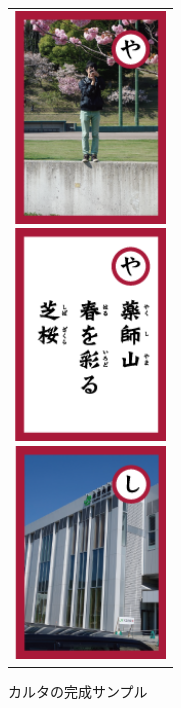 \begin{figure}[htbp]
  \begin{center}
    \begin{tabular}{c}

      \begin{minipage}{0.33\hsize}
        \begin{center}
\includegraphics[width=4cm, bb=0 0 320 552]{かるた案1.png}
        \end{center}
      \end{minipage}

      \begin{minipage}{0.33\hsize}
        \begin{center}
\includegraphics[width=4cm, bb=0 0 321 547]{かるた案5.png}
        \end{center}
      \end{minipage}

      \begin{minipage}{0.33\hsize}
        \begin{center}
\includegraphics[width=4cm, bb=0 0 320 548]{かるた案4.png}
        \end{center}
      \end{minipage}

    \end{tabular}
  \end{center}
\addtocounter{figure}{+0}
 \caption{カルタの完成サンプル}
\end{figure}

